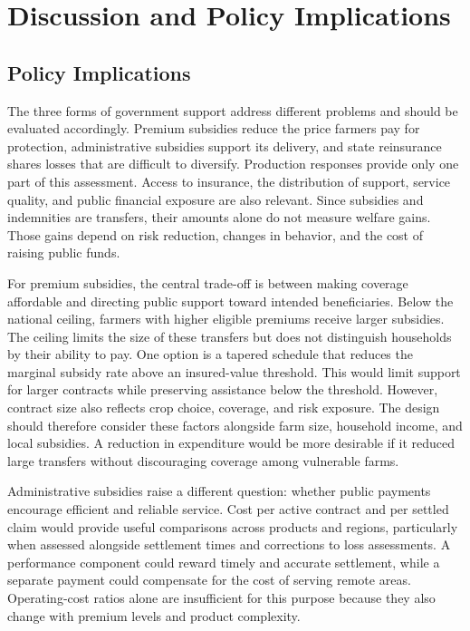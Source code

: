 \chapter{Discussion and Policy Implications}\label{ch:discussion}

\section{Policy Implications}\label{sec:policy}

The three forms of government support address different problems and should be evaluated accordingly. Premium subsidies reduce the price farmers pay for protection, administrative subsidies support its delivery, and state reinsurance shares losses that are difficult to diversify. Production responses provide only one part of this assessment. Access to insurance, the distribution of support, service quality, and public financial exposure are also relevant. Since subsidies and indemnities are transfers, their amounts alone do not measure welfare gains. Those gains depend on risk reduction, changes in behavior, and the cost of raising public funds.

For premium subsidies, the central trade-off is between making coverage affordable and directing public support toward intended beneficiaries. Below the national ceiling, farmers with higher eligible premiums receive larger subsidies. The ceiling limits the size of these transfers but does not distinguish households by their ability to pay. One option is a tapered schedule that reduces the marginal subsidy rate above an insured-value threshold. This would limit support for larger contracts while preserving assistance below the threshold. However, contract size also reflects crop choice, coverage, and risk exposure. The design should therefore consider these factors alongside farm size, household income, and local subsidies. A reduction in expenditure would be more desirable if it reduced large transfers without discouraging coverage among vulnerable farms.

Administrative subsidies raise a different question: whether public payments encourage efficient and reliable service. Cost per active contract and per settled claim would provide useful comparisons across products and regions, particularly when assessed alongside settlement times and corrections to loss assessments. A performance component could reward timely and accurate settlement, while a separate payment could compensate for the cost of serving remote areas. Operating-cost ratios alone are insufficient for this purpose because they also change with premium levels and product complexity.

